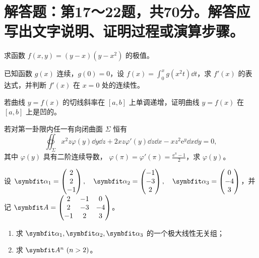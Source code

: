 \documentclass[zihao=5,fontset=windows,oneside]{exam-zh}
\newcommand{\WorkSpace}{\ifdefined\QuestionCrops\else\vfill\fi}
\newcommand{\WorkPageBreak}{\ifdefined\QuestionCrops\else\clearpage\fi}
\begin{document}
\ifdefined\QuestionCrops\else
  \section{解答题：第17～22题，共70分。解答应写出文字说明、证明过程或演算步骤。}
\fi

\begin{question}[index=17,points=10]
求函数 $f(x,y)=(y-x)(y-x^2)$ 的极值。
\end{question}
\QuestionBreak\WorkSpace

\begin{question}[index=18,points=12]
已知函数 $g(x)$ 连续，$g(0)=0$，设 $\displaystyle f(x)=\int_0^x g(x^2t)\dd t$，求 $f'(x)$ 的表达式，并判断 $f'(x)$ 在 $x=0$ 处的连续性。
\end{question}
\QuestionBreak\WorkSpace\WorkPageBreak

\begin{question}[index=19,points=12]
若曲线 $y=f(x)$ 的切线斜率在 $[a,b]$ 上单调递增，证明曲线 $y=f(x)$ 在 $[a,b]$ 上是凹的。
\end{question}
\QuestionBreak\WorkSpace

\begin{question}[index=20,points=12]
若对第一卦限内任一有向闭曲面 $\Sigma$ 恒有
\[
  \oiint_{\Sigma} x^2z\varphi(y)\dd y\dd z
  +2xz\varphi'(y)\dd z\dd x-xz^2\mathrm e^y\dd x\dd y=0,
\]
其中 $\varphi(y)$ 具有二阶连续导数，
$\displaystyle\varphi(\pi)=\varphi'(\pi)=\frac{\mathrm e^\pi-1}{2}$，求 $\varphi(y)$。
\end{question}
\QuestionBreak\WorkSpace\WorkPageBreak

\begin{question}[index=21,points=12]
设 $\displaystyle
  \symbfit\alpha_1=\begin{pmatrix}2\\2\\-1\end{pmatrix},\quad
  \symbfit\alpha_2=\begin{pmatrix}-1\\-3\\2\end{pmatrix},\quad
  \symbfit\alpha_3=\begin{pmatrix}0\\-4\\3\end{pmatrix}$，并记
$\displaystyle\symbfit A=\begin{pmatrix}2&-1&0\\2&-3&-4\\-1&2&3\end{pmatrix}$。
\begin{enumerate}[label=（\arabic*）,leftmargin=2.5em,labelsep=.4em,itemsep=3pt,topsep=3pt]
\item 求 $\symbfit\alpha_1,\symbfit\alpha_2,\symbfit\alpha_3$ 的一个极大线性无关组；
\item 求 $\symbfit A^n\ (n>2)$。
\end{enumerate}
\end{question}
\QuestionBreak\WorkSpace
\end{document}
